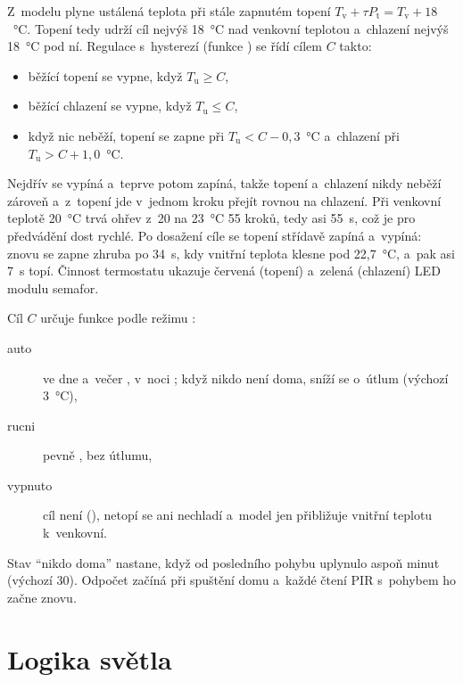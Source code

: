 Z~modelu plyne ustálená teplota při stále zapnutém topení $T_\mathrm{v} + \tau P_\mathrm{t} =
T_\mathrm{v} + 18$~°C. Topení tedy udrží cíl nejvýš 18~°C nad venkovní teplotou a~chlazení
nejvýš 18~°C pod ní. Regulace s~hysterezí (funkce ) se řídí cílem $C$ takto:
\begin{itemize}
  \item běžící topení se vypne, když $T_\mathrm{u} \geq C$,
  \item běžící chlazení se vypne, když $T_\mathrm{u} \leq C$,
  \item když nic neběží, topení se zapne při $T_\mathrm{u} < C - 0{,}3$~°C a~chlazení při
        $T_\mathrm{u} > C + 1{,}0$~°C.
\end{itemize}
Nejdřív se vypíná a~teprve potom zapíná, takže topení a~chlazení nikdy neběží zároveň a~z~topení
jde v~jednom kroku přejít rovnou na chlazení. Při venkovní teplotě 20~°C trvá ohřev z~20 na
23~°C 55 kroků, tedy asi 55~s, což je pro předvádění dost rychlé. Po dosažení cíle se topení
střídavě zapíná a~vypíná: znovu se zapne zhruba po 34~s, kdy vnitřní teplota klesne pod
22,7~°C, a~pak asi 7~s topí. Činnost termostatu ukazuje červená (topení) a~zelená (chlazení) LED
modulu semafor.

Cíl $C$ určuje funkce  podle režimu :
\begin{description}
  \item[auto] ve dne a~večer , v~noci ; když nikdo není doma, sníží
        se o~útlum  (výchozí 3~°C),
  \item[rucni] pevně , bez útlumu,
  \item[vypnuto] cíl není (), netopí se ani nechladí a~model jen přibližuje vnitřní
        teplotu k~venkovní.
\end{description}
Stav \enquote{nikdo doma} nastane, když od posledního pohybu uplynulo aspoň
 minut (výchozí 30). Odpočet začíná při spuštění domu a~každé čtení PIR
s~pohybem ho začne znovu.

\section{Logika světla}
\label{sec:svetlo}

